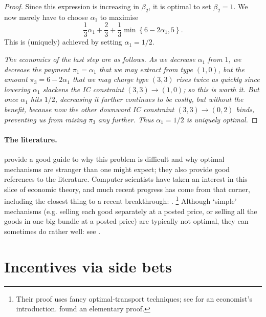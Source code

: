 \begin{proof}
	Since this expression is increasing in $\beta_2$, it is optimal to set $\beta_2 = 1$.
	We now merely have to choose $\alpha_1$ to maximise
	\begin{equation*}
		\frac{1}{3}\alpha_1 + \frac{2}{3}
		+ \frac{1}{3}\min\left\{ 6 - 2 \alpha_1, 5 \right\} .
	\end{equation*}
	This is (uniquely) achieved by setting $\alpha_1 = 1/2$.

	\emph{The economics of the last step are as follows.
	As we decrease $\alpha_1$ from $1$,
	we decrease the payment $\pi_1 = \alpha_1$ that we may extract from type $(1,0)$,
	but the amount $\pi_3 = 6-2\alpha_1$ that we may charge type $(3,3)$ rises twice as quickly since lowering $\alpha_1$ slackens the IC constraint $(3,3) \to (1,0)$;
	so this is worth it.
	But once $\alpha_1$ hits $1/2$, decreasing it further continues to be costly, but without the benefit, because now the other downward IC constraint $(3,3) \to (0,2)$ binds, preventing us from raising $\pi_3$ any further.
	Thus $\alpha_1 = 1/2$ is uniquely optimal.}
\end{proof}

\paragraph{The literature.}
\textcite{HartReny2015} provide a good guide to why this problem is difficult and why optimal mechanisms are stranger than one might expect; they also provide good references to the literature.
Computer scientists have taken an interest in this slice of economic theory, and much recent progress has come from that corner,
including the closest thing to a recent breakthrough: \textcite{DaskalakisDeckelbaumTzamos2017}.%
	\footnote{Their proof uses fancy optimal-transport techniques; see \textcite{Galichon2016} for an economist's introduction. \textcite{KleinerManelli2019} found an elementary proof.}
Although `simple' mechanisms (e.g. selling each good separately at a posted price, or selling all the goods in one big bundle at a posted price) are typically not optimal, they can sometimes do rather well: see \textcite{HartNisan2017}.



\section{Incentives via side bets}
\label{sec:ch1:CremerMclean}

